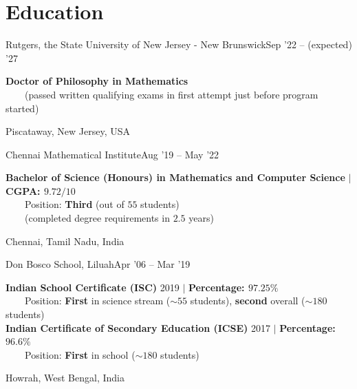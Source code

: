 \section{Education}
\resumeSubheading
{Rutgers, the State University of New Jersey - New Brunswick}{Sep '22 -- (expected) '27}
{\begin{minipage}{15cm} \color{grey}\textbf{Doctor of Philosophy in Mathematics}  \\
$\phantom{\qquad}$(passed written qualifying exams in first attempt just before program started) \end{minipage}
}{Piscataway, New Jersey, USA}
\vspace{-5pt}

\resumeSubheading
{Chennai Mathematical Institute}{Aug '19 -- May '22}
{\begin{minipage}{15cm} \color{grey}\textbf{Bachelor of Science (Honours) in Mathematics and Computer Science} $|$ \textbf{CGPA: $9.72/10$} \\
$\phantom{\qquad}$Position: \textbf{Third} (out of $55$ students)\\
$\phantom{\qquad}$(completed degree requirements in $2.5$ years) \end{minipage}
}{Chennai, Tamil Nadu, India}
\vspace{-5pt}
      
\resumeSubheading
{Don Bosco School, Liluah}{Apr '06 -- Mar '19}
{\begin{minipage}{15cm} \color{grey}\textbf{Indian School Certificate (ISC)} 2019 $|$ \textbf{Percentage: $97.25\%$} \\
$\phantom{\qquad}$Position: \textbf{First} in science stream ($\sim55$ students), \textbf{second} overall ($\sim180$ students) \\ 
\textbf{Indian Certificate of Secondary Education (ICSE)} 2017 $|$ \textbf{Percentage: $96.6\%$} \\
$\phantom{\qquad}$Position: \textbf{First} in school ($\sim180$ students) \end{minipage}
}{Howrah, West Bengal, India}
\vspace{-15pt}





